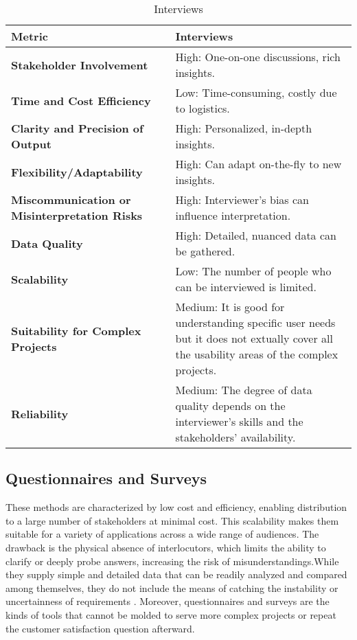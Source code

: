\documentclass[conference]{IEEEtran}
\begin{document}
{\color{red}
\begin{table}[htbp]
\caption{Interviews}
\label{tab1}
\centering
\begin{tabular}{|p{4cm}|p{4cm}|}
\hline
\textbf{Metric}                     & \textbf{Interviews}                                          \\ \hline
\textbf{Stakeholder Involvement}     & High: One-on-one discussions, rich insights.                  \\ \hline
\textbf{Time and Cost Efficiency}    & Low: Time-consuming, costly due to logistics.                \\ \hline
\textbf{Clarity and Precision of Output} & High: Personalized, in-depth insights.                      \\ \hline
\textbf{Flexibility/Adaptability}    & High: Can adapt on-the-fly to new insights.                  \\ \hline
\textbf{Miscommunication or Misinterpretation Risks} & High: Interviewer's bias can influence interpretation.     \\ \hline
\textbf{Data Quality}                    & High: Detailed, nuanced data can be gathered.               \\ \hline
\textbf{Scalability}                     & Low: The number of people who can be interviewed is limited. \\ \hline
\textbf{Suitability for Complex Projects} & Medium: It is good for understanding specific user needs but it does not extually cover all the usability areas of the complex projects. \\ \hline
\textbf{Reliability}                     & Medium: The degree of data quality depends on the interviewer’s skills and the stakeholders’ availability. \\ \hline
\end{tabular}
\end{table}}

\subsection*{Questionnaires and Surveys}
These methods are characterized by low cost and efficiency, enabling distribution to a large number of stakeholders at minimal cost. This scalability makes them suitable for a variety of applications across a wide range of audiences. The drawback is the physical absence of interlocutors, which limits the ability to clarify or deeply probe answers, increasing the risk of misunderstandings.While they supply simple and detailed data that can be readily analyzed and compared among themselves, they do not include the means of catching the instability or uncertainness of requirements \cite{cite15}. Moreover, questionnaires and surveys are the kinds of tools that cannot be molded to serve more complex projects or repeat the customer satisfaction question afterward.
\end{document}

